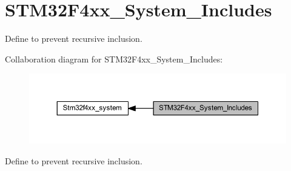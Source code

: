 \hypertarget{group___s_t_m32_f4xx___system___includes}{}\section{S\+T\+M32\+F4xx\+\_\+\+System\+\_\+\+Includes}
\label{group___s_t_m32_f4xx___system___includes}


Define to prevent recursive inclusion.  


Collaboration diagram for S\+T\+M32\+F4xx\+\_\+\+System\+\_\+\+Includes\+:\nopagebreak
\begin{figure}[H]
\begin{center}
\leavevmode
\includegraphics[width=350pt]{group___s_t_m32_f4xx___system___includes}
\end{center}
\end{figure}
Define to prevent recursive inclusion. 

